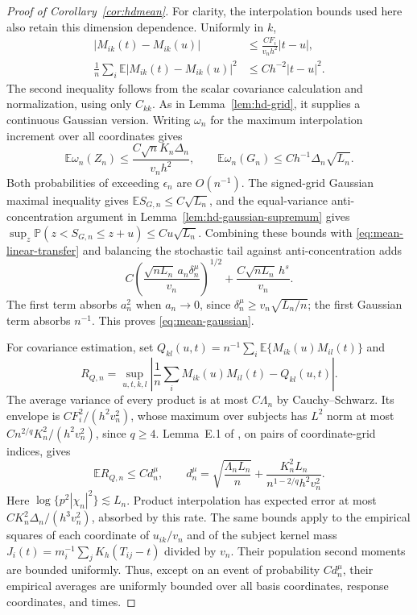 \documentclass[12pt]{article}
\newcommand{\expect}{\mathbb{E}}
\newcommand{\prob}{\mathbb{P}}
\numberwithin{equation}{section}
\begin{document}
\begin{proof}[Proof of Corollary~\ref{cor:hdmean}]
For clarity, the interpolation bounds used here also retain this
dimension dependence. Uniformly in $k$,
\[
\begin{aligned}
|M_{ik}(t)-M_{ik}(u)|
&\le \frac{CF_i}{v_nh^2}|t-u|,\\
\frac1n\sum_i\expect|M_{ik}(t)-M_{ik}(u)|^2
&\le Ch^{-2}|t-u|^2 .
\end{aligned}
\]
The second inequality follows from the scalar covariance calculation
and normalization, using only $C_{kk}$. As in
Lemma~\ref{lem:hd-grid}, it supplies a continuous Gaussian version.
Writing $\omega_n$ for the maximum interpolation increment over all
coordinates gives
\[
\expect\omega_n(Z_n)\le
\frac{C\sqrt n K_n\Delta_n}{v_nh^2},\qquad
\expect\omega_n(G_n)\le Ch^{-1}\Delta_n\sqrt{L_n}.
\]
Both probabilities of exceeding $\epsilon_n$ are $O(n^{-1})$.
The signed-grid Gaussian maximal inequality gives
$\expect S_{G,n}\le C\sqrt{L_n}$, and the equal-variance
anti-concentration argument in Lemma~\ref{lem:hd-gaussian-supremum}
gives
$\sup_z\prob(z<S_{G,n}\le z+u)\le Cu\sqrt{L_n}$.
Combining these bounds with \eqref{eq:mean-linear-transfer} and
balancing the stochastic tail against anti-concentration adds
\[
C\left(\frac{\sqrt{nL_n}\,a_n\delta_n^\mu}{v_n}\right)^{1/2}
+\frac{C\sqrt{nL_n}\,h^s}{v_n}.
\]
The first term absorbs $a_n^2$ when $a_n\to0$, since
$\delta_n^\mu\ge v_n\sqrt{L_n/n}$; the first Gaussian term absorbs
$n^{-1}$. This proves \eqref{eq:mean-gaussian}.

For covariance estimation, set
$Q_{kl}(u,t)=n^{-1}\sum_i\expect\{M_{ik}(u)M_{il}(t)\}$ and
\[
R_{Q,n}=\sup_{u,t,k,l}\left|
\frac1n\sum_i M_{ik}(u)M_{il}(t)-Q_{kl}(u,t)\right|.
\]
The average variance of every product is at most $C\Lambda_n$ by
Cauchy--Schwarz. Its envelope is $CF_i^2/(h^2v_n^2)$, whose maximum
over subjects has $L^2$ norm at most
$Cn^{2/q}K_n^2/(h^2v_n^2)$, since $q\ge4$.
Lemma~E.1 of \citet{chernozhukov_central_2017}, on pairs of
coordinate-grid indices, gives
\[
\expect R_{Q,n}\le Cd_n^\mu,\qquad
d_n^\mu=\sqrt{\frac{\Lambda_nL_n}{n}}+
\frac{K_n^2L_n}{n^{1-2/q}h^2v_n^2}.
\]
Here $\log\{p^2|\chi_n|^2\}\lesssim L_n$.
Product interpolation has expected error at most
$CK_n^2\Delta_n/(h^3v_n^2)$, absorbed by this rate.
The same bounds apply to the empirical squares of each coordinate
of $u_{ik}/v_n$ and of the subject kernel mass
$J_i(t)=m_i^{-1}\sum_j K_h(T_{ij}-t)$ divided by $v_n$.
Their population second moments are bounded uniformly. Thus, except
on an event of probability $Cd_n^\mu$, their empirical averages are
uniformly bounded over all basis coordinates, response coordinates,
and times.


\end{proof}
\end{document}
